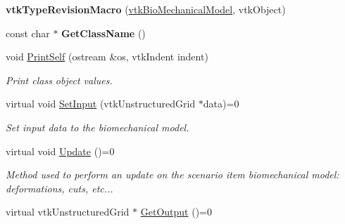 \begin{DoxyCompactItemize}
\item 
\hypertarget{classvtkBioMechanicalModel_ad1da24ecf194be6112ca4cf2786bc527}{
{\bfseries vtkTypeRevisionMacro} (\hyperlink{classvtkBioMechanicalModel}{vtkBioMechanicalModel}, vtkObject)}
\label{classvtkBioMechanicalModel_ad1da24ecf194be6112ca4cf2786bc527}

\item 
\hypertarget{classvtkBioMechanicalModel_a8c46194cc806ce28298d52ce117c2cce}{
const char $\ast$ {\bfseries GetClassName} ()}
\label{classvtkBioMechanicalModel_a8c46194cc806ce28298d52ce117c2cce}

\item 
\hypertarget{classvtkBioMechanicalModel_ad25f66c609caa39610c22ef4261b1199}{
void \hyperlink{classvtkBioMechanicalModel_ad25f66c609caa39610c22ef4261b1199}{PrintSelf} (ostream \&os, vtkIndent indent)}
\label{classvtkBioMechanicalModel_ad25f66c609caa39610c22ef4261b1199}

\begin{DoxyCompactList}\small\item\em Print class object values. \item\end{DoxyCompactList}\item 
\hypertarget{classvtkBioMechanicalModel_ac729eb24ed495e450a16ce369ad70f69}{
virtual void \hyperlink{classvtkBioMechanicalModel_ac729eb24ed495e450a16ce369ad70f69}{SetInput} (vtkUnstructuredGrid $\ast$data)=0}
\label{classvtkBioMechanicalModel_ac729eb24ed495e450a16ce369ad70f69}

\begin{DoxyCompactList}\small\item\em Set input data to the biomechanical model. \item\end{DoxyCompactList}\item 
\hypertarget{classvtkBioMechanicalModel_a147f53dac1854b61f88330c59817b822}{
virtual void \hyperlink{classvtkBioMechanicalModel_a147f53dac1854b61f88330c59817b822}{Update} ()=0}
\label{classvtkBioMechanicalModel_a147f53dac1854b61f88330c59817b822}

\begin{DoxyCompactList}\small\item\em Method used to perform an update on the scenario item biomechanical model: deformations, cuts, etc... \item\end{DoxyCompactList}\item 
\hypertarget{classvtkBioMechanicalModel_a0bc6867a67529170c43a279af9f86aa8}{
virtual vtkUnstructuredGrid $\ast$ \hyperlink{classvtkBioMechanicalModel_a0bc6867a67529170c43a279af9f86aa8}{GetOutput} ()=0}
\label{classvtkBioMechanicalModel_a0bc6867a67529170c43a279af9f86aa8}


\end{DoxyCompactItemize}
